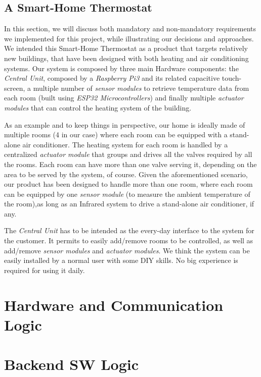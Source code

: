 \documentclass[a4paper]{article}
\begin{document}
        \subsection{A Smart-Home Thermostat}
        In this section, we will discuss both mandatory and non-mandatory requirements we implemented for this project, while illustrating our decisions and approaches.
        We intended this Smart-Home Thermostat as a product that targets relatively new buildings, that have been designed with both heating and air conditioning systems.
        Our system is composed by three main Hardware components: the \emph{Central Unit}, composed by a \emph{Raspberry Pi3} and its related capacitive touch-screen, a multiple number of \emph{sensor modules} to retrieve temperature data from each room (built using \emph{ESP32 Microcontrollers}) and finally multiple \emph{actuator modules} that can control the heating system of the building.

        As an example and to keep things in perspective, our home is ideally made of multiple rooms (4 in our case) where each room can be equipped with a stand-alone air conditioner. The heating system for each room is handled by a centralized \emph{actuator module} that groups and drives all the valves required by all the rooms. Each room can have more than one valve serving it, depending on the area to be served by the system, of course.
        Given the aforementioned scenario, our product has been designed to handle more than one room, where each room can be equipped by one \emph{sensor module} (to measure the ambient temperature of the room),as long as an Infrared system to drive a stand-alone air conditioner, if any.

        The \emph{Central Unit} has to be intended as the every-day interface to the system for the customer. It permits to easily add/remove rooms to be controlled, as well as add/remove \emph{sensor modules} and \emph{actuator modules}. We think the system can be easily installed by a normal user with some DIY skills. No big experience is required for using it daily.

    \section{Hardware and Communication Logic}

    \section{Backend SW Logic}
\end{document}
